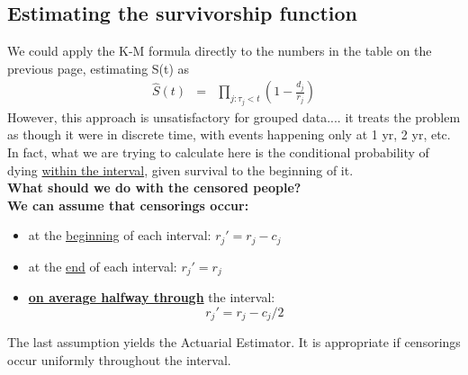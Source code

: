 \documentclass[11pt,slidesonly,semrot,portrait,palatino]{book}
\begin{document}
\subsection{Estimating the survivorship function}
We could apply the K-M formula directly to the numbers in
the table on the previous page,  estimating  S(t) as
\begin{eqnarray*}
\hat{S}(t) & = & \prod_{j: \tau_j < t} \left(1 - \frac{d_j}{r_j}\right)
\end{eqnarray*}
However, this approach is unsatisfactory for grouped data....
it treats the problem as though it were in discrete
time, with events happening only at 1 yr, 2 yr, etc.  In fact, what we are
trying to calculate here is the conditional probability of dying
\underline{within the interval}, given survival to the beginning of
it.
\\[2ex]
{\bf What should we do with the censored people?}\\[2ex]
{\bf We can assume that censorings occur:}
\begin{itemize}
\item at the \underline{beginning} of each interval:
$r_j' = r_j  - c_j $
\item at the \underline{end} of each interval:
$r_j' = r_j$
\item \underline{\bf on average halfway through} the interval:
$$r_j' = r_j  - c_j/2 $$
\end{itemize}
The last assumption yields the Actuarial Estimator.  It is
appropriate if censorings occur uniformly throughout the
interval.
\end{document}
